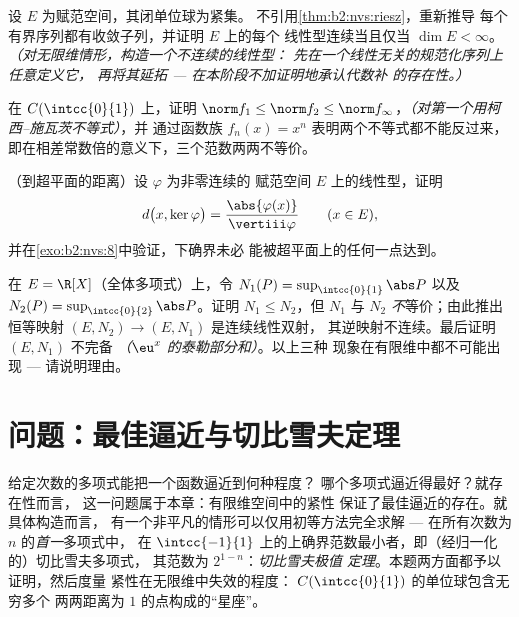 \begin{exercise}[$\star\star\star$]\label{exo:b2:nvs:9}
设 $E$ 为赋范空间，其闭单位球为紧集。
不引用\cref{thm:b2:nvs:riesz}，重新推导
每个有界序列都有收敛子列，并证明 $E$ 上的每个
线性型连续当且仅当 $\dim E < \infty$。
\emph{（对无限维情形，构造一个不连续的线性型：
先在一个线性无关的规范化序列上任意定义它，
再将其延拓 --- 在本阶段不加证明地承认代数补
的存在性。）}
\end{exercise}

\begin{exercise}[$\star\star$]\label{exo:b2:nvs:10}
在 $C(\intcc{0}{1})$ 上，证明 $\norm f_1 \leq \norm f_2 \leq \norm
f_\infty$，\emph{（对第一个用柯西--施瓦茨不等式）}，并
通过函数族 $f_n(x) = x^n$ 表明两个不等式都不能反过来，
即在相差常数倍的意义下，三个范数两两不等价。
\end{exercise}

\begin{exercise}[$\star\star$]\label{exo:b2:nvs:11}
（到超平面的距离）设 $\varphi$ 为非零连续的
赋范空间 $E$ 上的线性型，证明
\[
d\bigl(x, \ker\varphi\bigr) =
\frac{\abs{\varphi(x)}}{\vertiii\varphi}
\qquad (x \in E),
\]
并在\cref{exo:b2:nvs:8}中验证，下确界未必
能被超平面上的任何一点达到。
\end{exercise}

\begin{exercise}[$\star\star\star$]\label{exo:b2:nvs:12}
在 $E = \R[X]$（全体多项式）上，令 $N_1(P) =
\sup_{\intcc{0}{1}}\abs P$ 以及 $N_2(P) =
\sup_{\intcc{0}{2}}\abs P$。证明 $N_1 \leq N_2$，但
$N_1$ 与 $N_2$ \emph{不}等价；由此推出
恒等映射 $(E, N_2) \to (E, N_1)$ 是连续线性双射，
其逆映射不连续。最后证明 $(E, N_1)$
不完备 \emph{（$\eu^x$ 的泰勒部分和）}。以上三种
现象在有限维中都不可能出现 --- 请说明理由。
\end{exercise}

\section{问题：最佳逼近与切比雪夫定理}

给定次数的多项式能把一个函数逼近到何种程度？
哪个多项式逼近得最好？就存在性而言，
这一问题属于本章：有限维空间中的紧性
保证了最佳逼近的存在。就具体构造而言，
有一个非平凡的情形可以仅用初等方法完全求解 ---
在所有次数为 $n$ 的\emph{首一}多项式中，
在 $\intcc{-1}{1}$ 上的上确界范数最小者，即（经归一化的）切比雪夫多项式，
其范数为 $2^{1-n}$：\emph{切比雪夫极值
定理}。本题两方面都予以证明，然后度量
紧性在无限维中失效的程度：
$C(\intcc{0}{1})$ 的单位球包含无穷多个
两两距离为 $1$ 的点构成的“星座”。

